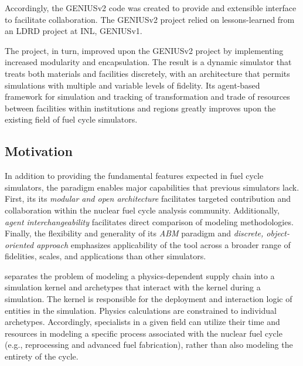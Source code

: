 Accordingly, the \gls{GENIUSv2}\cite{oliver_studying_2009,huff_geniusv2_2009} code
was created to provide and extensible interface to facilitate collaboration. 
The \gls{GENIUSv2} project relied on lessons-learned from an \gls{LDRD} project 
at \gls{INL}, 
\gls{GENIUSv1}\cite{dunzik-gougar_global_2007,jain_transitioning_2006}.

The \Cyclus project, in turn, improved upon the \gls{GENIUSv2} project by 
implementing increased modularity and encapsulation.
The result is  a dynamic simulator that treats both materials and facilities 
discretely, with an architecture that permits simulations with multiple and 
variable levels of fidelity. Its agent-based framework for simulation and 
tracking of transformation and trade of resources between facilities within 
institutions and regions greatly improves upon the existing field of fuel cycle 
simulators.

\subsection{Motivation}

In addition to providing the fundamental features expected in fuel cycle 
simulators, the \Cyclus paradigm enables major capabilities that previous 
simulators lack. First, its its \emph{modular and open architecture}  facilitates 
targeted contribution and collaboration within the nuclear fuel cycle analysis 
community.  Additionally, \emph{agent interchangeability} facilitates direct 
comparison of modeling methodologies. Finally, the flexibility and generality 
of its \emph{\gls{ABM}} paradigm and \emph{discrete, object-oriented approach} 
emphasizes applicability of the \Cyclus tool across a broader range of 
fidelities, scales, and applications than other simulators. 

\Cyclus separates the problem of modeling a
physics-dependent supply chain into a simulation kernel and archetypes that
interact with the kernel during a simulation. The kernel is responsible for the
deployment and interaction logic of entities in the simulation. Physics
calculations are constrained to individual archetypes. Accordingly, specialists
in a given field can utilize their time and resources in modeling a specific
process associated with the nuclear fuel cycle (e.g., reprocessing and advanced
fuel fabrication), rather than also modeling the entirety of the cycle.

